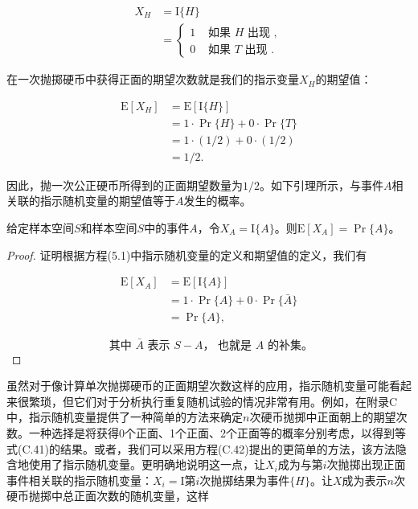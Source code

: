 \documentclass[lang=cn,newtx,10pt,scheme=chinese]{elegantbook}
\begin{document}
$$
\begin{aligned}
X_H & =\mathrm{I}\{H\} \\
& = \begin{cases}1 & \text { 如果 } H \text { 出现 }, \\
0 & \text { 如果 } T \text { 出现 } .\end{cases}
\end{aligned}
$$

在一次抛掷硬币中获得正面的期望次数就是我们的指示变量$X_H$的期望值：

$$
\begin{aligned}
\mathrm{E}[X_H] & =\mathrm{E}[\mathrm{I}\{H\}] \\
& =1 \cdot \operatorname{Pr}\{H\}+0 \cdot \operatorname{Pr}\{T\} \\
& =1 \cdot(1 / 2)+0 \cdot(1 / 2) \\
& =1 / 2 .
\end{aligned}
$$

因此，抛一次公正硬币所得到的正面期望数量为$1/2$。如下引理所示，与事件$A$相关联的指示随机变量的期望值等于$A$发生的概率。

\begin{lemma}{}{}
给定样本空间$S$和样本空间$S$中的事件$A$，令$X_A=\mathrm{I}\{A\}$。则$\mathrm{E}[X_A]=\operatorname{Pr}\{A\}$。
\end{lemma}

\begin{proof}
证明根据方程(5.1)中指示随机变量的定义和期望值的定义，我们有

$$
\begin{aligned}
\mathrm{E}[X_A] & =\mathrm{E}[\mathrm{I}\{A\}] \\
& =1 \cdot \operatorname{Pr}\{A\}+0 \cdot \operatorname{Pr}\{\bar{A}\} \\
& =\operatorname{Pr}\{A\},
\end{aligned}
$$

$$
\text { 其中 } \bar{A} \text { 表示 } S-A \text {， 也就是 } A \text { 的补集。}
$$
\end{proof}

虽然对于像计算单次抛掷硬币的正面期望次数这样的应用，指示随机变量可能看起来很繁琐，但它们对于分析执行重复随机试验的情况非常有用。例如，在附录$\mathrm{C}$中，指示随机变量提供了一种简单的方法来确定$n$次硬币抛掷中正面朝上的期望次数。一种选择是将获得0个正面、1个正面、2个正面等的概率分别考虑，以得到等式(C.41)的结果。或者，我们可以采用方程(C.42)提出的更简单的方法，该方法隐含地使用了指示随机变量。更明确地说明这一点，让$X_i$成为与第$i$次抛掷出现正面事件相关联的指示随机变量：$X_i=\mathrm{I}$第$i$次抛掷结果为事件$\{H\}$。让$X$成为表示$n$次硬币抛掷中总正面次数的随机变量，这样
\end{document}
